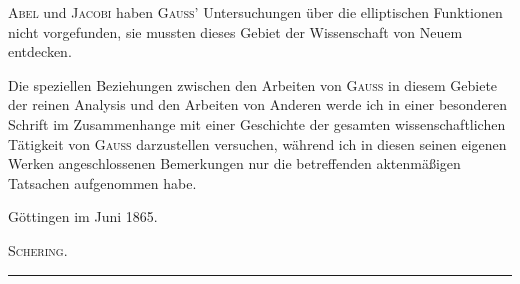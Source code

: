 \textsc{Abel} und \textsc{Jacobi} haben \textsc{Gauss}’ Untersuchungen über die elliptischen Funktionen nicht vorgefunden, sie mussten dieses Gebiet der Wissenschaft von Neuem entdecken.

Die speziellen Beziehungen zwischen den Arbeiten von \textsc{Gauss} in diesem Gebiete der reinen Analysis und den Arbeiten von Anderen werde ich in einer besonderen Schrift im Zusammenhange mit einer Geschichte der gesamten wissenschaftlichen Tätigkeit von \textsc{Gauss} darzustellen versuchen, während ich in diesen seinen eigenen Werken angeschlossenen Bemerkungen nur die betreffenden aktenmäßigen Tatsachen aufgenommen habe.

\par Göttingen im Juni 1865.
\begin{flushright}
\textsc{Schering}.
\end{flushright}
\begin{center}
\rule{0.27\linewidth}{0.2pt}
\end{center}

\clearpage
\endgroup
